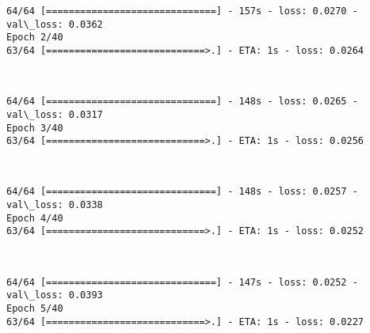\documentclass[11pt]{article}
\begin{document}
    \begin{Verbatim}[commandchars=\\\{\}]
64/64 [==============================] - 157s - loss: 0.0270 - val\_loss: 0.0362
Epoch 2/40
63/64 [============================>.] - ETA: 1s - loss: 0.0264
    \end{Verbatim}

    \begin{center}
    \end{center}
    { \hspace*{\fill} \\}
    
    \begin{Verbatim}[commandchars=\\\{\}]
64/64 [==============================] - 148s - loss: 0.0265 - val\_loss: 0.0317
Epoch 3/40
63/64 [============================>.] - ETA: 1s - loss: 0.0256
    \end{Verbatim}

    \begin{center}
    \end{center}
    { \hspace*{\fill} \\}
    
    \begin{Verbatim}[commandchars=\\\{\}]
64/64 [==============================] - 148s - loss: 0.0257 - val\_loss: 0.0338
Epoch 4/40
63/64 [============================>.] - ETA: 1s - loss: 0.0252
    \end{Verbatim}

    \begin{center}
    \end{center}
    { \hspace*{\fill} \\}
    
    \begin{Verbatim}[commandchars=\\\{\}]
64/64 [==============================] - 147s - loss: 0.0252 - val\_loss: 0.0393
Epoch 5/40
63/64 [============================>.] - ETA: 1s - loss: 0.0227
    \end{Verbatim}

    \begin{center}
    \end{center}
    { \hspace*{\fill} \\}
    
\end{document}
